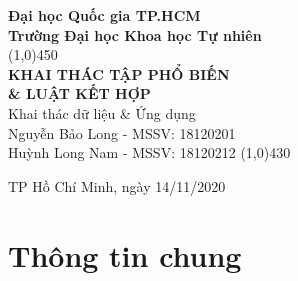 \documentclass[a4paper, 12pt]{article}
\begin{document}
\begin{titlepage}
    \begin{center}
        \vspace*{1cm}
        \Large\textbf{Đại học Quốc gia TP.HCM\\Trường Đại học Khoa học Tự nhiên}\\

        \vfill
        \line(1,0){450}\\[4mm]
        \LARGE\textbf{\MakeUppercase{Khai thác tập phổ biến \\\& luật kết hợp}}\\[3mm]
        \Large{Khai thác dữ liệu \& Ứng dụng}\\[3mm]
        \Large{Nguyễn Bảo Long - MSSV: 18120201}\\
        \Large{Huỳnh Long Nam - MSSV: 18120212}
        \line(1,0){430}\\
        \vfill

        \vfill
        TP Hồ Chí Minh, ngày 14/11/2020
    \end{center}
\end{titlepage}

\tableofcontents
\thispagestyle{empty}
\clearpage

\section{Thông tin chung}
\end{document}

